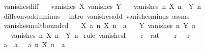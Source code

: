 \begin{isabellebody}
{\isafoldproof}%
%
\isadelimproof
\isanewline
%
\endisadelimproof
\isanewline
{}\isamarkupfalse%
\ vanishes{\isacharunderscore}{\kern0pt}diff{\isacharcolon}{\kern0pt}\isanewline
\ \ \ {\isachardoublequoteopen}vanishes\ X{\isachardoublequoteclose}\ {\isachardoublequoteopen}vanishes\ Y{\isachardoublequoteclose}\isanewline
\ \ \ {\isachardoublequoteopen}vanishes\ {\isacharparenleft}{\kern0pt}{\isasymlambda}n{\isachardot}{\kern0pt}\ X\ n\ {\isacharminus}{\kern0pt}\ Y\ n{\isacharparenright}{\kern0pt}{\isachardoublequoteclose}\isanewline
%
\isadelimproof
\ \ %
\endisadelimproof
%
\isatagproof
{}\isamarkupfalse%
\ diff{\isacharunderscore}{\kern0pt}conv{\isacharunderscore}{\kern0pt}add{\isacharunderscore}{\kern0pt}uminus\ \isamarkupfalse%
\ {\isacharparenleft}{\kern0pt}intro\ vanishes{\isacharunderscore}{\kern0pt}add\ vanishes{\isacharunderscore}{\kern0pt}minus\ assms{\isacharparenright}{\kern0pt}%
\endisatagproof
{\isafoldproof}%
%
\isadelimproof
\isanewline
%
\endisadelimproof
\isanewline
{}\isamarkupfalse%
\ vanishes{\isacharunderscore}{\kern0pt}mult{\isacharunderscore}{\kern0pt}bounded{\isacharcolon}{\kern0pt}\isanewline
\ \ \ X{\isacharcolon}{\kern0pt}\ {\isachardoublequoteopen}{\isasymexists}a{\isachargreater}{\kern0pt}{}{\isachardot}{\kern0pt}\ {\isasymforall}n{\isachardot}{\kern0pt}\ {\isasymbar}X\ n{\isasymbar}\ {\isacharless}{\kern0pt}\ a{\isachardoublequoteclose}\isanewline
\ \ \ Y{\isacharcolon}{\kern0pt}\ {\isachardoublequoteopen}vanishes\ {\isacharparenleft}{\kern0pt}{\isasymlambda}n{\isachardot}{\kern0pt}\ Y\ n{\isacharparenright}{\kern0pt}{\isachardoublequoteclose}\isanewline
\ \ \ {\isachardoublequoteopen}vanishes\ {\isacharparenleft}{\kern0pt}{\isasymlambda}n{\isachardot}{\kern0pt}\ X\ n\ {\isacharasterisk}{\kern0pt}\ Y\ n{\isacharparenright}{\kern0pt}{\isachardoublequoteclose}\isanewline
%
\isadelimproof
%
\endisadelimproof
%
\isatagproof
{}\isamarkupfalse%
\ {\isacharparenleft}{\kern0pt}rule\ vanishesI{\isacharparenright}{\kern0pt}\isanewline
\ \ \isamarkupfalse%
\ r\ {\isacharcolon}{\kern0pt}{\isacharcolon}{\kern0pt}\ rat\isanewline
\ \ \isamarkupfalse%
\ r{\isacharcolon}{\kern0pt}\ {\isachardoublequoteopen}{}\ {\isacharless}{\kern0pt}\ r{\isachardoublequoteclose}\isanewline
\ \ \isamarkupfalse%
\ a\ \ a{\isacharcolon}{\kern0pt}\ {\isachardoublequoteopen}{}\ {\isacharless}{\kern0pt}\ a{\isachardoublequoteclose}\ {\isachardoublequoteopen}{\isasymforall}n{\isachardot}{\kern0pt}\ {\isasymbar}X\ n{\isasymbar}\ {\isacharless}{\kern0pt}\ a{\isachardoublequoteclose}\isanewline

\end{isabellebody}

